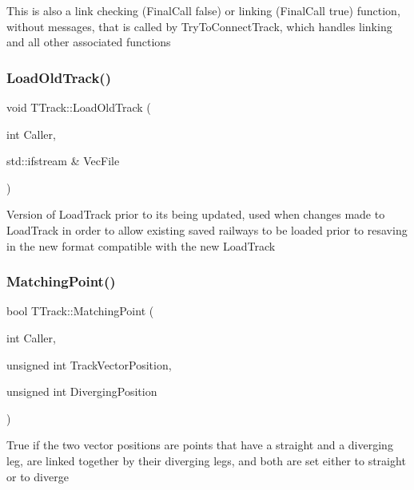 This is also a link checking (Final\+Call false) or linking (Final\+Call true) function, without messages, that is called by Try\+To\+Connect\+Track, which handles linking and all other associated functions \mbox{\label{class_t_track_abff18c1d577e257279c816da8868f232}} 
\subsubsection{\texorpdfstring{Load\+Old\+Track()}{LoadOldTrack()}}
{\footnotesize\ttfamily void T\+Track\+::\+Load\+Old\+Track (\begin{DoxyParamCaption}\item[{int}]{Caller,  }\item[{std\+::ifstream \&}]{Vec\+File }\end{DoxyParamCaption})}

Version of Load\+Track prior to its being updated, used when changes made to Load\+Track in order to allow existing saved railways to be loaded prior to resaving in the new format compatible with the new Load\+Track \mbox{\label{class_t_track_aa60a7460b2d95189e8de3817e4ad21f2}} 
\subsubsection{\texorpdfstring{Matching\+Point()}{MatchingPoint()}}
{\footnotesize\ttfamily bool T\+Track\+::\+Matching\+Point (\begin{DoxyParamCaption}\item[{int}]{Caller,  }\item[{unsigned int}]{Track\+Vector\+Position,  }\item[{unsigned int}]{Diverging\+Position }\end{DoxyParamCaption})}

True if the two vector positions are points that have a straight and a diverging leg, are linked together by their diverging legs, and both are set either to straight or to diverge \mbox{\label{class_t_track_a9d209cb6e24f67ba12020440a5e42347}} 
